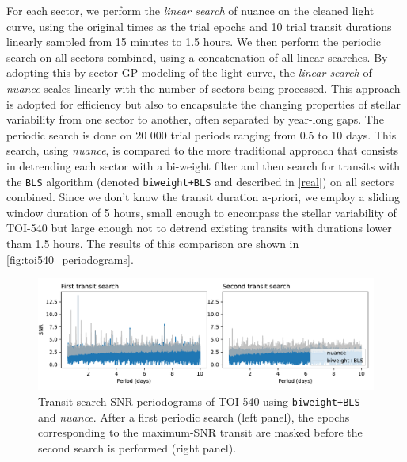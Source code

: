 \documentclass{aastex631}
\newcommand{\nuancemethod}{\textit{nuance}}
\newcommand{\nuance}{\nuancemethod{}}
\begin{document}
For each sector, we perform the \textit{linear search} of nuance on the cleaned light curve, using the original times as the trial epochs and 10 trial transit durations linearly sampled from 15 minutes to 1.5 hours. We then perform the periodic search on all sectors combined, using a concatenation of all linear searches. By adopting this by-sector GP modeling of the light-curve, the \textit{linear search} of \nuance{} scales linearly with the number of sectors being processed. This approach is adopted for efficiency but also to encapsulate the changing properties of stellar variability from one sector to another, often separated by year-long gaps. The periodic search is done on 20 000 trial periods ranging from 0.5 to 10 days. This search, using \nuance{}, is compared to the more traditional approach that consists in detrending each sector with a bi-weight filter and then search for transits with the \texttt{BLS} algorithm (denoted \texttt{biweight+BLS} and described in \autoref{real}) on all sectors combined. Since we don't know the transit duration a-priori, we employ a sliding window duration of 5 hours, small enough to encompass the stellar variability of TOI-540 but large enough not to detrend existing transits with durations lower tham 1.5 hours. The results of this comparison are shown in \autoref{fig:toi540_periodograms}.


\begin{figure}[H]
    \begin{centering}
        \includegraphics[width=0.9\linewidth]{../workflows/comparison_toi/figures/TOI 540/periodograms.pdf} 
        \caption{Transit search SNR periodograms of TOI-540 using \texttt{biweight+BLS} and \nuance{}. After a first periodic search (left panel), the epochs corresponding to the maximum-SNR transit are masked before the second search is performed (right panel).}
        \label{fig:toi540_periodograms}
    \end{centering}
\end{figure}
\end{document}
